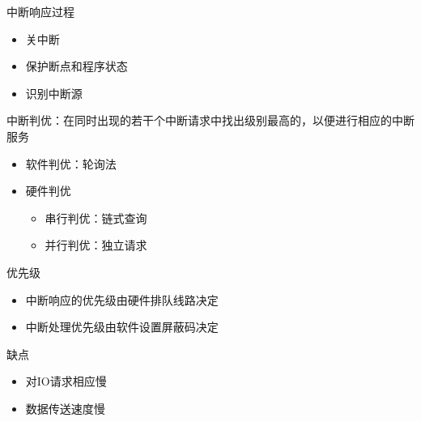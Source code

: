 中断响应过程
\begin{itemize}
	\item 关中断
	\item 保护断点和程序状态
	\item 识别中断源
\end{itemize}
中断判优：在同时出现的若干个中断请求中找出级别最高的，以便进行相应的中断服务
\begin{itemize}
	\item 软件判优：轮询法
	\item 硬件判优
	\begin{itemize}
		\item 串行判优：链式查询
		\item 并行判优：独立请求
	\end{itemize}
\end{itemize}
优先级
\begin{itemize}
	\item 中断响应的优先级由硬件排队线路决定
	\item 中断处理优先级由软件设置屏蔽码决定
\end{itemize}
缺点
\begin{itemize}
	\item 对IO请求相应慢
	\item 数据传送速度慢
\end{itemize}

